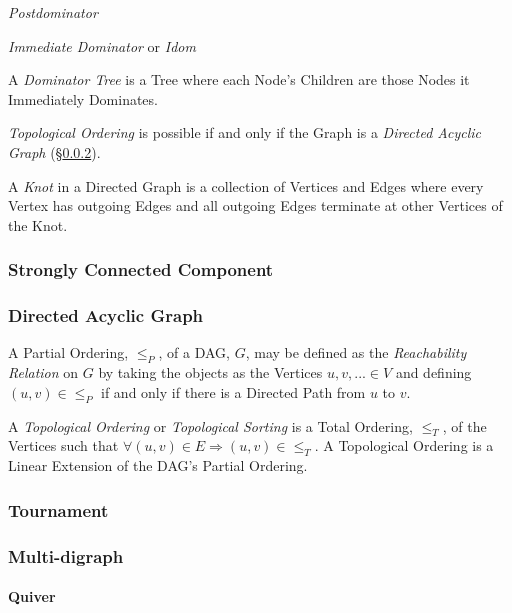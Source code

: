 \emph{Postdominator}

\emph{Immediate Dominator} or \emph{Idom}

A \emph{Dominator Tree} is a Tree where each Node's Children are those
Nodes it Immediately Dominates.

\emph{Topological Ordering} is possible if and only if the Graph is a
\emph{Directed Acyclic Graph} (\S\ref{sec:dag}).

A \emph{Knot} in a Directed Graph is a collection of Vertices and
Edges where every Vertex has outgoing Edges and all outgoing Edges
terminate at other Vertices of the Knot.



\subsubsection{Strongly Connected Component}
\label{sec:strongly_connected}

\subsubsection{Directed Acyclic Graph} \label{sec:dag}

A Partial Ordering, $\leq_P$, of a DAG, $G$, may be defined as the
\emph{Reachability Relation} on $G$ by taking the objects as the
Vertices $u,v,... \in V$ and defining $(u,v) \in \leq_P$ if and only
if there is a Directed Path from $u$ to $v$.

A \emph{Topological Ordering} or \emph{Topological Sorting} is a Total
Ordering, $\leq_T$, of the Vertices such that $\forall (u,v) \in E
\Rightarrow (u,v) \in \leq_T$. A Topological Ordering is a Linear
Extension of the DAG's Partial Ordering. %



\subsubsection{Tournament}\label{sec:tournament}



\subsubsection{Multi-digraph}\label{sec:multi-digraph}

\paragraph{Quiver}\label{sec:quiver}
\hfill \\

